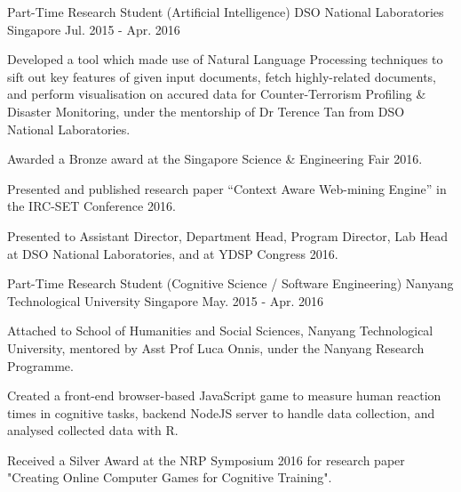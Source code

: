 \begin{cventries}
  \cventry
    {Part-Time Research Student (Artificial Intelligence)} %
    {DSO National Laboratories} %
    {Singapore} %
    {Jul. 2015 - Apr. 2016} %
    {
      \begin{cvitems} %
        \item {Developed a tool which made use of Natural Language Processing techniques to sift out key features of given input documents, fetch highly-related documents, and perform visualisation on accured data for Counter-Terrorism Profiling \& Disaster Monitoring, under the mentorship of Dr Terence Tan from DSO National Laboratories.}
        \item {Awarded a Bronze award at the Singapore Science \& Engineering Fair 2016.}
        \item {Presented and published research paper “Context Aware Web-mining Engine” in the IRC-SET Conference 2016.}
        \item {Presented to Assistant Director, Department Head, Program Director, Lab Head at DSO National Laboratories, and at YDSP Congress 2016.}
      \end{cvitems}
    }

  \cventry
    {Part-Time Research Student (Cognitive Science / Software Engineering)} %
    {Nanyang Technological University} %
    {Singapore} %
    {May. 2015 - Apr. 2016} %
    {
      \begin{cvitems} %
        \item {Attached to School of Humanities and Social Sciences, Nanyang Technological University, mentored by Asst Prof Luca Onnis, under the Nanyang Research Programme.}
        \item {Created a front-end browser-based JavaScript game to measure human reaction times in cognitive tasks, backend NodeJS server to handle data collection, and analysed collected data with R.}
        \item {Received a Silver Award at the NRP Symposium 2016 for research paper "Creating Online Computer Games for Cognitive Training".}
      \end{cvitems}
    }


\end{cventries}
